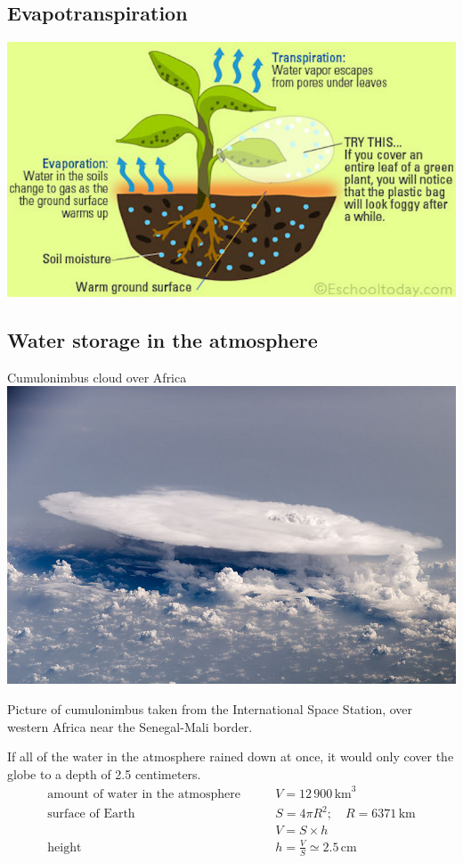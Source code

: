 \documentclass[
  letterpaper,
  DIV=11,
  numbers=noendperiod]{scrreprt}
\begin{document}
\hypertarget{evapotranspiration}{%
\subsection{Evapotranspiration}\label{evapotranspiration}}

\includegraphics{archive/figures/evapotranspiration1.jpg}

\hypertarget{water-storage-in-the-atmosphere}{%
\subsection{Water storage in the
atmosphere}\label{water-storage-in-the-atmosphere}}

Cumulonimbus cloud over Africa
\includegraphics{archive/figures/cumulonimbus.jpg}

Picture of cumulonimbus taken from the International Space Station, over
western Africa near the Senegal-Mali border.

If all of the water in the atmosphere rained down at once, it would only
cover the globe to a depth of 2.5 centimeters. \[
\begin{align}
\text{amount of water in the atmosphere} & \qquad V = 12\, 900\, \text{km}^3 \\
\text{surface of Earth} & \qquad S = 4 \pi R^2;\quad R=6371\,\text{km}\\
& \qquad V = S \times h \\
\text{height} & \qquad h = \frac{V}{S} \simeq 2.5\,\text{cm}
\end{align}
\]
\end{document}
